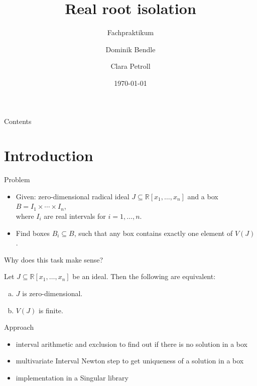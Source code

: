 \documentclass[german,10pt,xcolor=colortbl,compress,handout]{beamer}
\title{Real root isolation}
\subtitle{Fachpraktikum}
\date{\today}
\author{Dominik Bendle \and Clara Petroll}
\institute{AG Algebra, Geometrie und Computeralgebra \\ Supervisor: Janko Böhm}
\begin{document}
\maketitle
\begin{frame}{Contents}
    \tableofcontents
\end{frame}

\section{Introduction}
\begin{frame}{Problem}
    \begin{itemize}
        \item Given: zero-dimensional radical ideal  $J \subseteq \mathbb{R}[x_1, \hdots,
            x_n]$ and a box  $B=I_1 \times \cdots \times I_n$, \\where $I_i$ are real intervals for $i=1,\hdots,n$.
        \pause
        \item Find boxes $B_i \subseteq B$, such that any box contains exactly one element
            of $V(J)$.
    \end{itemize}
    \pause

    Why does this task make sense?
    \pause
    \begin{lemma}
        Let $J \subseteq \mathbb{R}[x_1, \hdots, x_n]$ be an ideal. Then the following are
        equivalent:
        \begin{enumerate}[a)]
            \item $J$ is zero-dimensional.
            \item $V(J)$ is finite.
        \end{enumerate}
    \end{lemma}
\end{frame}

\begin{frame}{Approach}
    \begin{itemize}
    \item interval arithmetic and exclusion to find out if there is no solution in a box
    \pause
    \item multivariate Interval Newton step to get uniqueness of a solution in a box
    \pause
    \item implementation in a Singular library
    \end{itemize}
\end{frame}
\end{document}
